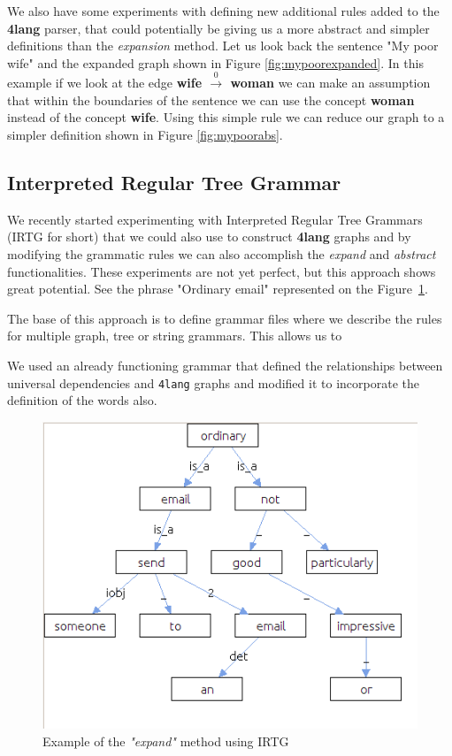 We also have some experiments with defining new additional rules added to the \textbf{4lang} parser, that could potentially be giving us a more abstract and simpler definitions than the \textit{expansion} method. Let us look back the sentence "My poor wife" and the expanded graph shown in Figure \ref{fig:mypoorexpanded}. In this example if we look at the edge \textbf{wife $\xrightarrow0$ woman} we can make an assumption that within the boundaries of the sentence we can use the concept \textbf{woman} instead of the concept \textbf{wife}. Using this simple rule we can reduce our graph to a simpler definition shown in Figure \ref{fig:mypoorabs}.

\subsection{Interpreted Regular Tree Grammar}
We recently started experimenting with Interpreted Regular Tree Grammars \cite{Koller:2011} (IRTG for short) that we could also use to construct \textbf{4lang} graphs and by modifying the grammatic rules we can also accomplish the \textit{expand} and \textit{abstract} functionalities. These experiments are not yet perfect, but this approach shows great potential. See the phrase "Ordinary email" represented on the Figure~\ref{fig:irtg}.

The base of this approach is to define grammar files where we describe the rules for multiple graph, tree or string grammars. This allows us to 

We used an already functioning grammar that defined the relationships between universal dependencies and \texttt{4lang} graphs and modified it to incorporate the definition of the words also.

\begin{figure}[h]
	\centering
	\includegraphics[scale=0.75]{irtg.jpg}
	\caption{Example of the \textit{"expand"} method using IRTG}
	\label{fig:irtg}
\end{figure}